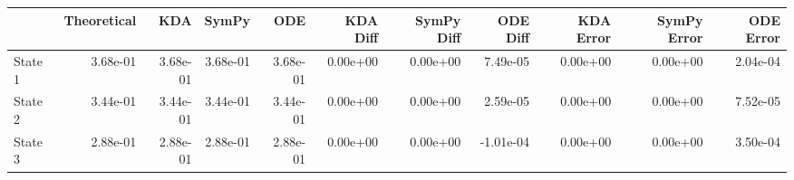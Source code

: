 \begin{tabular}{lrrrrrrrrrr}
\toprule
{} &  Theoretical &      KDA &    SymPy &      ODE &  KDA Diff &  SymPy Diff &  ODE Diff &  KDA Error &  SymPy Error &  ODE Error \\
\midrule
State 1 &     3.68e-01 & 3.68e-01 & 3.68e-01 & 3.68e-01 &  0.00e+00 &    0.00e+00 &  7.49e-05 &   0.00e+00 &     0.00e+00 &   2.04e-04 \\
State 2 &     3.44e-01 & 3.44e-01 & 3.44e-01 & 3.44e-01 &  0.00e+00 &    0.00e+00 &  2.59e-05 &   0.00e+00 &     0.00e+00 &   7.52e-05 \\
State 3 &     2.88e-01 & 2.88e-01 & 2.88e-01 & 2.88e-01 &  0.00e+00 &    0.00e+00 & -1.01e-04 &   0.00e+00 &     0.00e+00 &   3.50e-04 \\
\bottomrule
\end{tabular}
